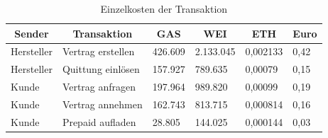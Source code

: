 \begin{table}[h]
\caption{Einzelkosten der Transaktion}
\label{tab:calc2}
\begin{adjustwidth}{-.5in}{-.5in}
\begin{center}
\begin{tabular}{@{}llllll@{}}
\toprule
\multicolumn{1}{c}{\textbf{Sender}} & \multicolumn{1}{c}{\textbf{Transaktion}} & \multicolumn{1}{c}{\textbf{GAS}} & \multicolumn{1}{c}{\textbf{WEI}} & \multicolumn{1}{c}{\textbf{ETH}} & \multicolumn{1}{c}{\textbf{Euro}} \\ \midrule
Hersteller & Vertrag erstellen & 426.609 & 2.133.045 & 0,002133 & 0,42 \\
Hersteller & Quittung einlösen & 157.927 & 789.635 & 0,00079 & 0,15 \\ \midrule
Kunde & Vertrag anfragen & 197.964 & 989.820 & 0,00099 & 0,19 \\
Kunde & Vertrag annehmen & 162.743 & 813.715 & 0,000814 & 0,16 \\
Kunde & Prepaid aufladen & 28.805 & 144.025 & 0,000144 & 0,03 \\ \bottomrule
\end{tabular}
\end{center}
\end{adjustwidth}
\end{table}


